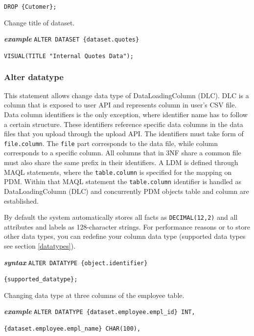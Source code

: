 \documentclass[a4paper, 12pt, titlepage, fleqn]{article}
\begin{document}
\hspace{2.5cm}\verb=DROP {Cutomer};=

\noindent Change title of dataset.

\textbf{\emph{example}}  \hspace{.9cm}\verb=ALTER DATASET {dataset.quotes}=

\hspace{2.5cm}\verb=VISUAL(TITLE "Internal Quotes Data");=

\subsubsection{Alter datatype}
This statement allows change data type of DataLoadingColumn (DLC). DLC is a column that is exposed to user API and represents column in user's CSV file. Data column identifiers is the only exception, where identifier name has to follow a certain structure. These identifiers reference specific data columns in the data files that you upload through the upload API. The identifiers must take form of \verb=file.column=. The \verb=file= part corresponds to the data file, while column corresponds to a specific column. All columns that in 3NF share a common file must also share the same prefix in their identifiers. A LDM is defined through MAQL statements, where the \verb=table.column= is specified for the mapping on PDM. Within that MAQL statement the \verb=table.column= identifier is handled as DataLoadingColumn (DLC) and concurrently PDM objects table and column are established. 

By default the system automatically stores all facts as \verb=DECIMAL(12,2)= and all attributes and labels as 128-character strings. For performance reasons or to store other data types, you can redefine your column data type (supported data types see section \ref{datatypes}).

\textbf{\emph{syntax}}  \hspace{.9cm}\verb=ALTER DATATYPE {object.identifier}=

\hspace{2.2cm}\verb={supported_datatype};=

\noindent Changing data type at three columns of the employee table.

\textbf{\emph{example}}  \hspace{.9cm}\verb=ALTER DATATYPE {dataset.employee.empl_id} INT,=

\hspace{2.5cm}\verb={dataset.employee.empl_name} CHAR(100),=
\end{document}
